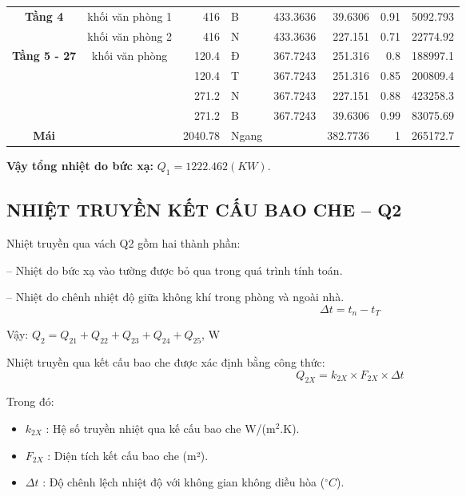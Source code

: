 \begin{table}[H]
\begin{adjustbox}{width=\textwidth}
\begin{tabular}{|c|r|r|l|r|r|r|r|}
		\hline
		\multirow{2}[4]{*}{\textbf{Tầng 4}} & \multicolumn{1}{l|}{khối văn phòng 1} & 416   & B     & 433.3636 & 39.6306 & 0.91  & 5092.793 \bigstrut\\
		\cline{2-8}          & \multicolumn{1}{l|}{khối văn phòng 2} & 416   & N     & 433.3636 & 227.151 & 0.71  & 22774.92 \bigstrut\\
		\hline
		\multirow{4}[8]{*}{\textbf{Tầng 5 - 27}} & \multicolumn{1}{c|}{\multirow{4}[8]{*}{khối văn phòng}} & 120.4 & Đ     & 367.7243 & 251.316 & 0.8   & 188997.1 \bigstrut\\
		\cline{3-8}          &       & 120.4 & T     & 367.7243 & 251.316 & 0.85  & 200809.4 \bigstrut\\
		\cline{3-8}          &       & 271.2 & N     & 367.7243 & 227.151 & 0.88  & 423258.3 \bigstrut\\
		\cline{3-8}          &       & 271.2 & B     & 367.7243 & 39.6306 & 0.99  & 83075.69 \bigstrut\\
		\hline
		\textbf{Mái} &       & 2040.78 & Ngang &       & 382.7736 & 1     & 265172.7 \bigstrut\\
		\hline
	\end{tabular}%
\end{adjustbox}
	\label{b:ndbxmt}%
\end{table}%

\textbf{Vậy tổng nhiệt do bức xạ:} $Q_{1} = 1222.462(KW)$.

\subsection{NHIỆT TRUYỀN KẾT CẤU BAO CHE -- Q{\scriptsize 2}}
Nhiệt truyền qua vách Q2 gồm hai thành phần:

-- Nhiệt do bức xạ vào tường được bỏ qua trong quá trình tính toán.

-- Nhiệt do chênh nhiệt độ giữa không khí trong phòng và ngoài nhà.
\begin{equation*}
	\Delta t = t_{n} - t_{T}
\end{equation*}

Vậy: $Q_{2} = Q_{21} + Q_{22} + Q_{23} + Q_{24} + Q_{25}$, W 

Nhiệt truyền qua kết cấu bao che được xác định bằng công thức:
\begin{equation*}
	Q_{2X} = k_{2X}\times F_{2X}\times\Delta t
\end{equation*}

Trong đó:
\begin{itemize}[leftmargin = 2.2cm]
	\item $k_{2X}$ : Hệ số truyền nhiệt qua kế cấu bao che W/(m$^2$.K).
	\item $F_{2X}$ : Diện tích kết cấu bao che (m²).
	\item $\Delta t$ : Độ chênh lệch nhiệt độ với không gian không diều hòa ($^{\circ}C$).
\end{itemize}

